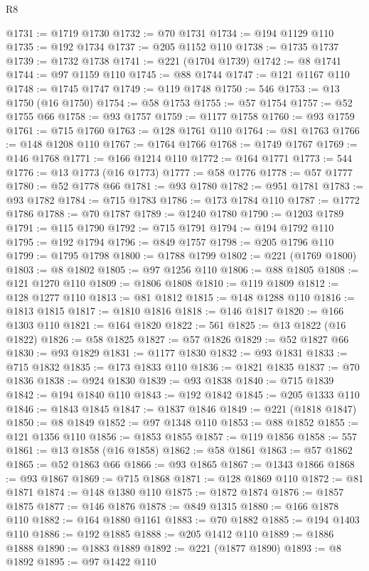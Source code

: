 \begin{lexlean}{R8}
\begin{coremodule}
@1731 := @1719 @1730
@1732 := @70 @1731
@1734 := @194 @1129 @110
@1735 := @192 @1734
@1737 := @205 @1152 @110
@1738 := @1735 @1737
@1739 := @1732 @1738
@1741 := @221 (@1704 @1739)
@1742 := @8 @1741
@1744 := @97 @1159 @110
@1745 := @88 @1744
@1747 := @121 @1167 @110
@1748 := @1745 @1747
@1749 := @119 @1748
@1750 := 546
@1753 := @13 @1750 (@16 @1750)
@1754 := @58 @1753
@1755 := @57 @1754
@1757 := @52 @1755 @66
@1758 := @93 @1757
@1759 := @1177 @1758
@1760 := @93 @1759
@1761 := @715 @1760
@1763 := @128 @1761 @110
@1764 := @81 @1763
@1766 := @148 @1208 @110
@1767 := @1764 @1766
@1768 := @1749 @1767
@1769 := @146 @1768
@1771 := @166 @1214 @110
@1772 := @164 @1771
@1773 := 544
@1776 := @13 @1773 (@16 @1773)
@1777 := @58 @1776
@1778 := @57 @1777
@1780 := @52 @1778 @66
@1781 := @93 @1780
@1782 := @951 @1781
@1783 := @93 @1782
@1784 := @715 @1783
@1786 := @173 @1784 @110
@1787 := @1772 @1786
@1788 := @70 @1787
@1789 := @1240 @1780
@1790 := @1203 @1789
@1791 := @115 @1790
@1792 := @715 @1791
@1794 := @194 @1792 @110
@1795 := @192 @1794
@1796 := @849 @1757
@1798 := @205 @1796 @110
@1799 := @1795 @1798
@1800 := @1788 @1799
@1802 := @221 (@1769 @1800)
@1803 := @8 @1802
@1805 := @97 @1256 @110
@1806 := @88 @1805
@1808 := @121 @1270 @110
@1809 := @1806 @1808
@1810 := @119 @1809
@1812 := @128 @1277 @110
@1813 := @81 @1812
@1815 := @148 @1288 @110
@1816 := @1813 @1815
@1817 := @1810 @1816
@1818 := @146 @1817
@1820 := @166 @1303 @110
@1821 := @164 @1820
@1822 := 561
@1825 := @13 @1822 (@16 @1822)
@1826 := @58 @1825
@1827 := @57 @1826
@1829 := @52 @1827 @66
@1830 := @93 @1829
@1831 := @1177 @1830
@1832 := @93 @1831
@1833 := @715 @1832
@1835 := @173 @1833 @110
@1836 := @1821 @1835
@1837 := @70 @1836
@1838 := @924 @1830
@1839 := @93 @1838
@1840 := @715 @1839
@1842 := @194 @1840 @110
@1843 := @192 @1842
@1845 := @205 @1333 @110
@1846 := @1843 @1845
@1847 := @1837 @1846
@1849 := @221 (@1818 @1847)
@1850 := @8 @1849
@1852 := @97 @1348 @110
@1853 := @88 @1852
@1855 := @121 @1356 @110
@1856 := @1853 @1855
@1857 := @119 @1856
@1858 := 557
@1861 := @13 @1858 (@16 @1858)
@1862 := @58 @1861
@1863 := @57 @1862
@1865 := @52 @1863 @66
@1866 := @93 @1865
@1867 := @1343 @1866
@1868 := @93 @1867
@1869 := @715 @1868
@1871 := @128 @1869 @110
@1872 := @81 @1871
@1874 := @148 @1380 @110
@1875 := @1872 @1874
@1876 := @1857 @1875
@1877 := @146 @1876
@1878 := @849 @1315
@1880 := @166 @1878 @110
@1882 := @164 @1880 @1161
@1883 := @70 @1882
@1885 := @194 @1403 @110
@1886 := @192 @1885
@1888 := @205 @1412 @110
@1889 := @1886 @1888
@1890 := @1883 @1889
@1892 := @221 (@1877 @1890)
@1893 := @8 @1892
@1895 := @97 @1422 @110

\end{coremodule}
\end{lexlean}
